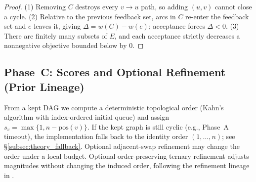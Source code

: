 \documentclass{article}
\begin{document}
\begin{proof}
(1) Removing $C$ destroys every $v\rightarrow u$ path, so adding $(u,v)$ cannot close a cycle.
(2) Relative to the previous feedback set, arcs in $C$ re-enter the feedback set and $e$ leaves it, giving $\Delta=w(C)-w(e)$; acceptance forces $\Delta<0$.
(3) There are finitely many subsets of $E$, and each acceptance strictly decreases a nonnegative objective bounded below by $0$.
\end{proof}

\subsection{Phase~C: Scores and Optional Refinement (Prior Lineage)}
\label{subsec:framework_phaseC}
From a kept DAG we compute a deterministic topological order (Kahn's algorithm with index-ordered initial queue) and assign $s_v=\max\{1,n-\mathrm{pos}(v)\}$. If the kept graph is still cyclic (e.g., Phase~A timeout), the implementation falls back to the identity order $(1,\dots,n)$; see \S\ref{subsec:theory_fallback}. Optional adjacent-swap refinement may change the order under a local budget. Optional order-preserving ternary refinement adjusts magnitudes without changing the induced order, following the refinement lineage in \citet{VK25}.
\end{document}
